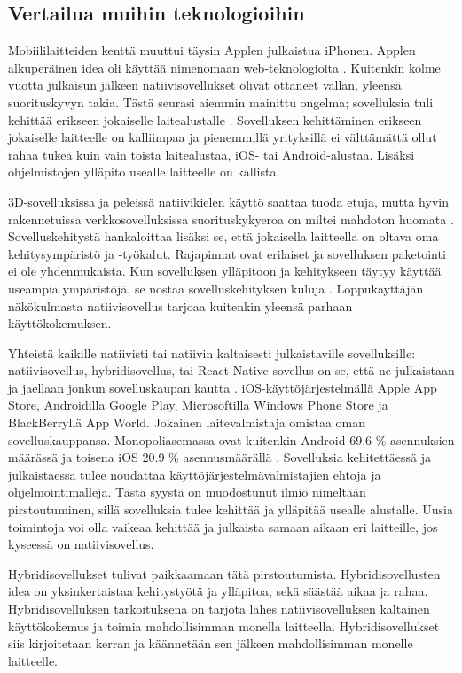 \documentclass{tktltiki}
\begin{document}
\subsection{Vertailua muihin teknologioihin}

Mobiililaitteiden kenttä muuttui täysin Applen julkaistua iPhonen. Applen alkuperäinen idea oli käyttää nimenomaan web-teknologioita \cite{charland2011mobile}. Kuitenkin kolme vuotta julkaisun jälkeen natiivisovellukset olivat ottaneet vallan, yleensä suorituskyvyn takia. Tästä seurasi aiemmin mainittu ongelma; sovelluksia tuli kehittää erikseen jokaiselle laitealustalle \cite{charland2011mobile}. Sovelluksen kehittäminen erikseen jokaiselle laitteelle on kalliimpaa ja pienemmillä yrityksillä ei välttämättä ollut rahaa tukea kuin vain toista laitealustaa, iOS- tai Android-alustaa. Lisäksi ohjelmistojen ylläpito usealle laitteelle on kallista.

3D-sovelluksissa ja peleissä natiivikielen käyttö saattaa tuoda etuja, mutta hyvin rakennetuissa verkkosovelluksissa suorituskykyeroa on miltei mahdoton huomata \cite{charland2011mobile}. Sovelluskehitystä hankaloittaa lisäksi se, että jokaisella laitteella on oltava oma kehitysympäristö ja -työkalut. Rajapinnat ovat erilaiset ja sovelluksen paketointi ei ole yhdenmukaista. Kun sovelluksen ylläpitoon ja kehitykseen täytyy käyttää useampia ympäristöjä, se nostaa sovelluskehityksen kuluja \cite{xanthopoulos2013comparative}. Loppukäyttäjän näkökulmasta natiivisovellus tarjoaa kuitenkin yleensä parhaan käyttökokemuksen.

Yhteistä kaikille natiivisti tai natiivin kaltaisesti julkaistaville sovelluksille: natiivisovellus, hybridisovellus, tai React Native sovellus on se, että ne julkaistaan ja jaellaan jonkun sovelluskaupan kautta \cite{xanthopoulos2013comparative}. iOS-käyttöjärjestelmällä Apple App Store, Androidilla Google Play, Microsoftilla Windows Phone Store ja BlackBerryllä App World. Jokainen laitevalmistaja omistaa oman sovelluskauppansa. Monopoliasemassa ovat kuitenkin Android 69,6 \% asennuksien määrässä ja toisena iOS 20.9 \% asennusmäärällä \cite{xanthopoulos2013comparative}. Sovelluksia kehitettäessä ja julkaistaessa tulee noudattaa käyttöjärjestelmävalmistajien ehtoja ja ohjelmointimalleja. Tästä syystä on muodostunut ilmiö nimeltään pirstoutuminen, sillä sovelluksia tulee kehittää ja ylläpitää usealle alustalle. Uusia toimintoja voi olla vaikeaa kehittää ja julkaista samaan aikaan eri laitteille, jos kyseessä on natiivisovellus.

Hybridisovellukset tulivat paikkaamaan tätä pirstoutumista. Hybridisovellusten idea on yksinkertaistaa kehitystyötä ja ylläpitoa, sekä säästää aikaa ja rahaa. Hybridisovelluksen tarkoituksena on tarjota lähes natiivisovelluksen kaltainen käyttökokemus ja toimia mahdollisimman monella laitteella. Hybridisovellukset siis kirjoitetaan kerran ja käännetään sen jälkeen mahdollisimman monelle laitteelle. 
\end{document}
